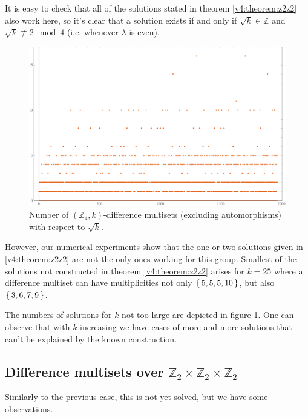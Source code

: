 \documentclass{article}
\theoremstyle{plain}
\theoremstyle{definition}
\theoremstyle{remark}
\begin{document}
			It is easy to check that all of the solutions stated in theorem \ref{v4:theorem:z2z2} also work here, so it's clear that a solution exists if and only if $\sqrt k \in \mathbb Z$ and $\sqrt k \not\equiv 2 \mod 4$ (i.e. whenever $\lambda$ is even).
			
			\begin{figure}
				\includegraphics[width=\textwidth]{z4}
				\caption{Number of $(\mathbb Z_4, k)$-difference multisets (excluding automorphisms) with respect to $\sqrt k$.}
				\label{other:z4:figure:results}
			\end{figure}
			
			However, our numerical experiments show that the one or two solutions given in \ref{v4:theorem:z2z2} are not the only ones working for this group. Smallest of the solutions not constructed in theorem \ref{v4:theorem:z2z2} arises for $k=25$ where a difference multiset can have multiplicities not only $\set{5,5,5,10}$, but also $\set{3,6,7,9}$. 

			The numbers of solutions for $k$ not too large are depicted in figure \ref{other:z4:figure:results}. One can observe that with $k$ increasing we have cases of more and more solutions that can't be explained by the known construction.
			
		\subsection{Difference multisets over $\mathbb Z_2 \times \mathbb Z_2 \times \mathbb Z_2$}
			Similarly to the previous case, this is not yet solved, but we have some observations.
			
\end{document}

